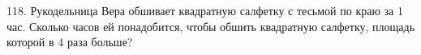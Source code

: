 118. Рукодельница Вера обшивает квадратную салфетку с тесьмой по краю за 1 час. Сколько часов ей понадобится, чтобы обшить квадратную салфетку, площадь которой в 4 раза больше?\\
